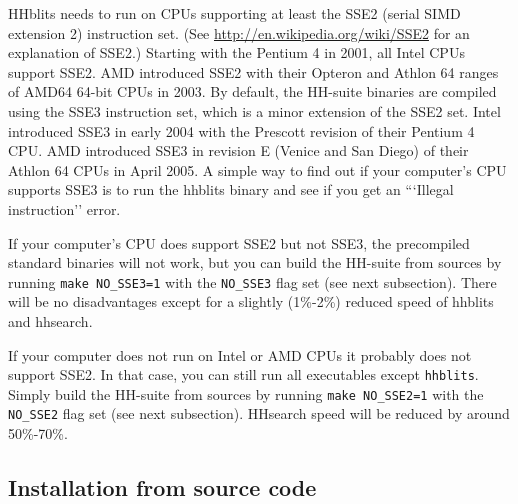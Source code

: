 \documentclass[11pt,a4paper]{article}
\begin{document}
HHblits needs to run on CPUs supporting at least the SSE2 (serial SIMD extension 2) instruction set. (See \url{http://en.wikipedia.org/wiki/SSE2} for an explanation of SSE2.) Starting with the Pentium 4 in 2001, all Intel CPUs support SSE2. AMD introduced SSE2 with their Opteron and Athlon 64 ranges of AMD64 64-bit CPUs in 2003. By default, the HH-suite binaries are compiled using the SSE3 instruction set, which is a minor extension of the SSE2 set. Intel introduced SSE3 in early 2004 with the Prescott revision of their Pentium 4 CPU. AMD introduced SSE3 in revision E (Venice and San Diego) of their Athlon 64 CPUs in April 2005. A simple way to find out if your computer's CPU supports SSE3 is to run the hhblits binary and see if you get an ```Illegal instruction'' error.

If your computer's CPU does support SSE2 but not SSE3, the precompiled standard binaries will not work, but you can build the HH-suite from sources by running \verb`make NO_SSE3=1` with the \verb`NO_SSE3` flag set (see next subsection). There will be no disadvantages except for a slightly (1\%-2\%) reduced speed of hhblits and hhsearch.

If your computer does not run on Intel or AMD CPUs it probably does not support SSE2. In that case, you can still run all executables except \verb`hhblits`. Simply build the HH-suite from sources by running \verb`make NO_SSE2=1` with the \verb`NO_SSE2` flag set (see next subsection). HHsearch speed will be reduced by around 50\%-70\%.

\subsection{Installation from source code} \label{installation}

\newenvironment{enum}
 {\begin{list}{\arabic{mycounter}.~~}{\usecounter{mycounter} \labelsep=0em \labelwidth=0em \leftmargin=0em \itemindent=0em}}
 {\end{list}}
\end{document}
